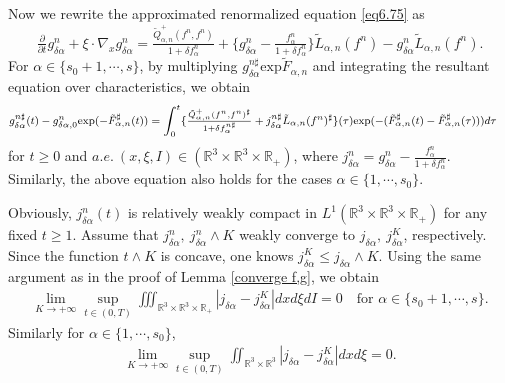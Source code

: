 \documentclass[reqno,11pt]{amsart}
\numberwithin{equation}{section}
\def\R{\mathbb{R}}
\def\exp{\mathrm{exp}}
\begin{document}
Now we rewrite the approximated renormalized equation \eqref{eq6.75} as
\begin{equation*}
	\tfrac{\partial }{\partial t} g^n_{\delta \alpha } + \xi \cdot \nabla_x g^n_{\delta \alpha } = \tfrac{\tilde{Q}^+_{\alpha ,n} (f^n,f^n)}{1+\delta f^n_\alpha} +\{g^n_{\delta \alpha } -\tfrac{f^n_\alpha}{1+\delta f^n_\alpha}\} \tilde{L}_{\alpha ,n} (f^n) -g^n_{\delta \alpha }\tilde{L}_{\alpha ,n} (f^n) .
\end{equation*}
For $\alpha \in \{s_0 + 1,\cdots,s \}$, by multiplying $g^{n\sharp}_{\delta \alpha } \exp\tilde{F} _{\alpha ,n }$ and integrating the resultant equation over characteristics, we obtain
\begin{equation}\label{eq8.93}{\footnotesize
	\begin{aligned}
		& g^{n\sharp}_{\delta \alpha } (t) -g^n_{\delta \alpha,0}  \exp(-\tilde{F}^\sharp _{\alpha ,n } (t)) = \int_{0}^{t} \{\tfrac{\tilde{Q}^+_{\alpha ,n} (f^n,f^n)^\sharp }{1+\delta f^{n\sharp }_\alpha} +j^{n\sharp}_{\delta \alpha }\tilde{L}_{\alpha ,n}(f^n)^\sharp\} (\tau) \exp(-(\tilde{F}^\sharp _{\alpha ,n } (t)- \tilde{F}^\sharp _{\alpha ,n } (\tau))) d \tau
	\end{aligned}}
\end{equation}
for $t \geq 0 $ and $a.e. \ ( x, \xi, I ) \in ( \R^3 \times \R^3 \times \R_+ )$, where $j^{n}_{\delta \alpha } =g^{n}_{\delta \alpha } -\frac{f^n_\alpha}{1+\delta f^n_\alpha}$. Similarly, the above equation also holds for the cases $\alpha \in \{ 1, \cdots, s_0 \}$.

Obviously, $j^{n}_{\delta \alpha } (t)$ is relatively weakly compact in $L^1 (\R^3 \times \R^3 \times \R_+)$ for any fixed $t \geq 1$. Assume that $j^{n}_{\delta \alpha },\ j^{n}_{\delta \alpha }\wedge K$ weakly converge to $j_{\delta \alpha },\  j^K_{\delta \alpha }$, respectively. Since the function $ t \wedge K $ is concave, one knows $j^K_{\delta \alpha } \leq j_{\delta \alpha }\wedge K$. Using the same argument as in the proof of Lemma \ref{converge f,g}, we obtain
\begin{equation}\label{eq8.94}
	\begin{aligned}
		\lim \limits_{K\rightarrow +\infty }\sup \limits_{t\in (0,T)} \iiint_{ \R^3 \times \R^3 \times \R_+} |j_{\delta \alpha }-j^K_{\delta \alpha }|dxd\xi dI= 0 \quad \text{for } \alpha \in \{s_0+1,\cdots,s\}.
	\end{aligned}
\end{equation}
Similarly for $\alpha \in \{1,\cdots,s_0 \}$,
\begin{equation}\label{eq8.95}
	\begin{aligned}
		\lim \limits_{K\rightarrow +\infty }\sup \limits_{t\in (0,T)} \iint_{ \R^3 \times \R^3} |j_{\delta \alpha }-j^K_{\delta \alpha }|dxd\xi = 0.
	\end{aligned}
\end{equation}
\end{document}
